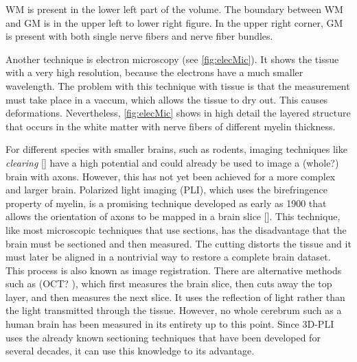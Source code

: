 \ac{WM} is present in the lower left part of the volume. 
The boundary between \ac{WM} and \ac{GM} is in the upper left to lower right figure.
In the upper right corner, \ac{GM} is present with both single nerve fibers and nerve fiber bundles.
\par
% 
Another technique is electron microscopy (see \cref{fig:elecMic}).
It shows the tissue with a very high resolution, because the electrons have a much smaller wavelength.
The problem with this technique with tissue is that the measurement must take place in a vaccum, which allows the tissue to dry out.
This causes deformations.
Nevertheless, \cref{fig:elecMic} shows in high detail the layered structure that occurs in the white matter with nerve fibers of different myelin thickness.
\par
% 
For different species with smaller brains, such as rodents, imaging techniques like \textit{clearing} [\dummy{}] have a high potential and could already be used to image a (whole?) brain with axons.
However, this has not yet been achieved for a more complex and larger brain.
Polarized light imaging (PLI), which uses the birefringence property of myelin, is a promising technique developed as early as 1900 that allows the orientation of axons to be mapped in a brain slice [\dummy{}].
This technique, like most microscopic techniques that use sections, has the disadvantage that the brain must be sectioned and then measured.
The cutting distorts the tissue and it must later be aligned in a nontrivial way to restore a complete brain dataset.
This process is also known as image registration.
There are alternative methods such as (OCT? \cite{Aumann2019}), which first measures the brain slice, then cuts away the top layer, and then measures the next slice. It uses the reflection of light rather than the light transmitted through the tissue.
However, no whole cerebrum such as a human brain has been measured in its entirety up to this point.
Since \ac{3D-PLI} uses the already known sectioning techniques that have been developed for several decades, it can use this knowledge to its advantage.
% 
%
